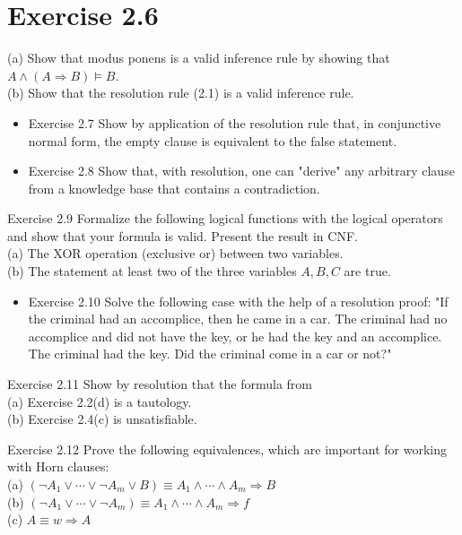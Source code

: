 \documentclass[10pt]{book}
\begin{document}
\section*{Exercise 2.6}
(a) Show that modus ponens is a valid inference rule by showing that $A \wedge(A \Rightarrow B) \models B$.\\

(b) Show that the resolution rule (2.1) is a valid inference rule.

\begin{itemize}
  \item Exercise 2.7 Show by application of the resolution rule that, in conjunctive normal form, the empty clause is equivalent to the false statement.
  \item Exercise 2.8 Show that, with resolution, one can "derive" any arbitrary clause from a knowledge base that contains a contradiction.
\end{itemize}

Exercise 2.9 Formalize the following logical functions with the logical operators and show that your formula is valid. Present the result in CNF.\\
(a) The XOR operation (exclusive or) between two variables.\\
(b) The statement at least two of the three variables $A, B, C$ are true.

\begin{itemize}
  \item Exercise 2.10 Solve the following case with the help of a resolution proof: "If the criminal had an accomplice, then he came in a car. The criminal had no accomplice and did not have the key, or he had the key and an accomplice. The criminal had the key. Did the criminal come in a car or not?"
\end{itemize}

Exercise 2.11 Show by resolution that the formula from\\
(a) Exercise 2.2(d) is a tautology.\\
(b) Exercise 2.4(c) is unsatisfiable.

Exercise 2.12 Prove the following equivalences, which are important for working with Horn clauses:\\
(a) $\left(\neg A_{1} \vee \cdots \vee \neg A_{m} \vee B\right) \equiv A_{1} \wedge \cdots \wedge A_{m} \Rightarrow B$\\
(b) $\left(\neg A_{1} \vee \cdots \vee \neg A_{m}\right) \equiv A_{1} \wedge \cdots \wedge A_{m} \Rightarrow f$\\
(c) $A \equiv w \Rightarrow A$
\end{document}
